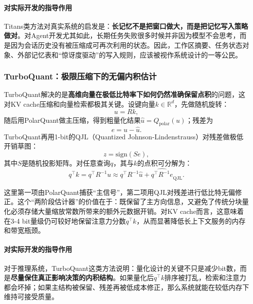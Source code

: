 \documentclass[12pt,a4paper]{article}
\begin{document}
\paragraph{对实际开发的指导作用}

Titans类方法对真实系统的启发是：\textbf{长记忆不是把窗口做大，而是把记忆写入策略做对}。对Agent开发尤其如此，长期任务失败很多时候并非因为模型不会思考，而是因为会话历史没有被压缩成可再次利用的状态。因此，工作区摘要、任务状态对象、外部记忆表和“惊讶度驱动”的写入规则，应该被视作系统设计的一等公民。

\subsubsection{TurboQuant：极限压缩下的无偏内积估计}

TurboQuant解决的是\textbf{高维向量在极低比特率下如何仍然准确保留点积}的问题，这对KV cache压缩和向量检索都极其关键。设键向量$k \in \mathbb{R}^d$，先做随机旋转：
\begin{equation}
u = Rk,
\end{equation}
随后用PolarQuant做主压缩，得到粗量化结果$\hat{u}=Q_{\text{polar}}(u)$；残差为
\begin{equation}
e = u - \hat{u}.
\end{equation}
TurboQuant再用1-bit的QJL（Quantized Johnson-Lindenstrauss）对残差做极低开销草图：
\begin{equation}
z = \text{sign}(Se),
\end{equation}
其中$S$是随机投影矩阵。对任意查询$q$，其与$k$的点积可分解为：
\begin{equation}
q^\top k = q^\top R^{-1} u \approx q^\top R^{-1}\hat{u} + \widehat{q^\top R^{-1} e}_{\text{QJL}}.
\end{equation}

这里第一项由PolarQuant捕获“主信号”，第二项用QJL对残差进行低比特无偏修正。这个“两阶段估计器”的价值在于：既保留了主方向信息，又避免了传统分块量化必须存储大量缩放常数所带来的额外元数据开销。对KV cache而言，这意味着在3-4 bit量级仍可较好地保留注意力分数$q^\top k$，从而显著降低长上下文服务的内存和带宽瓶颈。
\paragraph{对实际开发的指导作用}

对于推理系统，TurboQuant这类方法说明：量化设计的关键不只是减少bit数，而是\textbf{尽量保住真正影响决策的内积结构}。如果量化后$q^\top k$排序被打乱，检索和注意力都会坏掉；如果主结构被保留、残差再被低成本修正，那么系统就能在较低内存下维持可接受质量。
\end{document}
